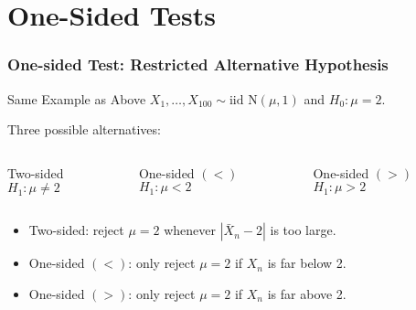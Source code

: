 \section{One-Sided Tests}
\begin{frame}
  \frametitle{One-sided Test: Restricted Alternative Hypothesis} 

  \begin{block}{Same Example as Above}
  $X_1, \dots, X_{100}\sim \mbox{iid N}(\mu, 1)$ and $H_0\colon \mu=2$. 
\end{block}

\begin{alertblock}{Three possible alternatives:}

  \begin{columns}
    \begin{block}{Two-sided}
      $H_1\colon \mu \neq 2$
    \end{block}
    \begin{block}{One-sided $(<)$}
      $H_1\colon \mu < 2$
    \end{block}
    \begin{block}{One-sided $(>)$}
      $H_1\colon \mu > 2$
    \end{block}
  \end{columns}
\end{alertblock}

  \vspace{1em}

  \begin{itemize}
    \item Two-sided: reject $\mu = 2$ whenever $|\bar{X}_n - 2|$ is too large.
    \item One-sided $(<)$: only reject $\mu = 2$ if $X_n$ is far \alert{below} 2.
    \item One-sided $(>)$: only reject $\mu = 2$ if $X_n$ is far \alert{above} 2.
  \end{itemize}
\end{frame}

